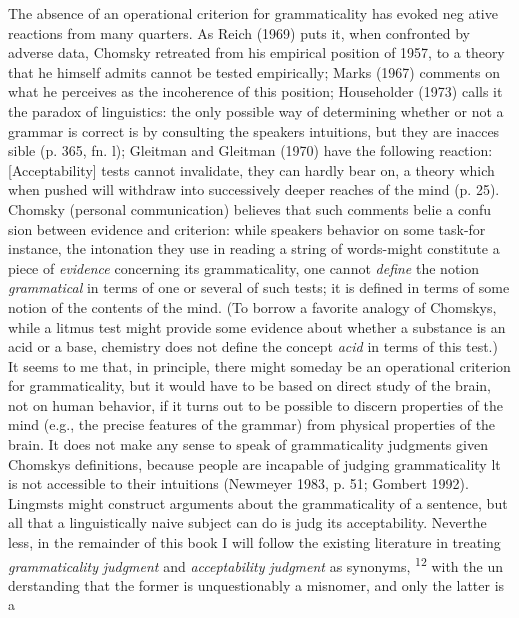 \begin{styleStandard}
The absence of an operational criterion for grammaticality has evoked neg\- ative reactions from many quarters. As Reich (1969) puts it, {\textquotedbl}when confronted by adverse data, Chomsky retreated from his empirical position of 1957, to a theory that he himself admits cannot be tested empirically{\textquotedbl}; Marks (1967) comments on what he perceives as the incoherence of this position; Householder (1973) calls it {\textquotedbl}the paradox of linguistics: the only possible way of determining whether or not a grammar is correct is by consulting the speaker{\textquotesingle}s intuitions, but they are inacces\- sible{\textquotedbl} (p. 365, fn. l); Gleitman and Gleitman (1970) have the following reaction: {\textquotedbl}[Acceptability] tests cannot invalidate, they can hardly bear on, a theory which when pushed will withdraw into successively deeper reaches of the mind{\textquotedbl} (p. 25). Chomsky (personal communication) believes that such comments belie a confu\- sion between evidence and criterion: while speakers{\textquotesingle} behavior on some task-for instance, the intonation they use in reading a string of words-might constitute a piece of \textit{evidence}\textit{ }concerning its grammaticality, one cannot \textit{define}\textit{ }the notion \textit{grammatical}\textit{ }in terms of one or several of such tests; it is defined in terms of some notion of the contents of the mind. (To borrow a favorite analogy of Chomsky{\textquotesingle}s, while a litmus test might provide some evidence about whether a substance is an acid or a base, chemistry does not define the concept \textit{acid}\textit{ }in terms of this test.) It seems to me that, in principle, there might someday be an operational criterion for grammaticality, but it would have to be based on direct study of the brain, not on human behavior, if it turns out to be possible to discern properties of the mind (e.g., the precise features of the grammar) from physical properties of the brain. It does not make any sense to speak of grammaticality judgments given Chomsky{\textquotesingle}s definitions, because people are incapable of judging grammaticality\- lt is not accessible to their intuitions (Newmeyer 1983, p. 51; Gombert 1992). Lingmsts might construct arguments about the grammaticality of a sentence, but all that a linguistically naive subject can do is judg its acceptability. Neverthe\- less, in the remainder of this book I will follow the existing literature in treating \textit{grammaticality}\textit{ }\textit{judgment}\textit{ }and \textit{acceptability}\textit{ }\textit{judgment}\textit{ }as synonyms, \textsuperscript{12}\textsuperscript{ }with the un\- derstanding that the former is unquestionably a misnomer, and only the latter is a
\end{styleStandard}


